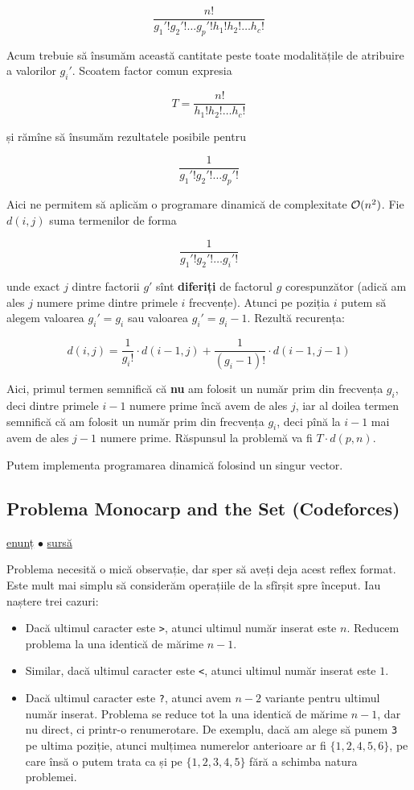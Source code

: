 \documentclass[../main.tex]{subfiles}
\begin{document}
$$\frac{n!}{g_1'! g_2'! \dots g_p'! h_1! h_2! \dots h_c!}$$

Acum trebuie să însumăm această cantitate peste toate modalitățile de atribuire a valorilor $g_i'$. Scoatem factor comun expresia

$$T = \frac{n!}{h_1! h_2! \dots h_c!}$$

și rămîne să însumăm rezultatele posibile pentru

$$\frac{1}{g_1'! g_2'! \dots g_p'!}$$

Aici ne permitem să aplicăm o programare dinamică de complexitate $\mathcal{O}(n^2)$. Fie $d(i, j)$ suma termenilor de forma

$$\frac{1}{g_1'! g_2'! \dots g_i'!}$$

unde exact $j$ dintre factorii $g'$ sînt \textbf{diferiți} de factorul $g$ corespunzător (adică am ales $j$ numere prime dintre primele $i$ frecvențe). Atunci pe poziția $i$ putem să alegem valoarea $g_i' = g_i$ sau valoarea $g_i' = g_i - 1$. Rezultă recurența:

$$d(i, j) = \frac{1}{g_i!} \cdot d(i - 1, j) + \frac{1}{(g_i - 1)!} \cdot d(i - 1, j - 1)$$

Aici, primul termen semnifică că \textbf{nu} am folosit un număr prim din frecvența $g_i$, deci dintre primele $i-1$ numere prime încă avem de ales $j$, iar al doilea termen semnifică că am folosit un număr prim din frecvența $g_i$, deci pînă la $i-1$ mai avem de ales $j-1$ numere prime. Răspunsul la problemă va fi $T \cdot d(p, n)$.

Putem implementa programarea dinamică folosind un singur vector.

\subsection{Problema Monocarp and the Set (Codeforces)}
\label{problem:monocarp-and-the-set}

\href{https://codeforces.com/contest/1886/problem/D}{enunț}
$\bullet$
\hyperref[code:monocarp-and-the-set]{sursă}

Problema necesită o mică observație, dar sper să aveți deja acest reflex format. Este mult mai simplu să considerăm operațiile de la sfîrșit spre început. Iau naștere trei cazuri:

\begin{itemize}
  \item Dacă ultimul caracter este \texttt{>}, atunci ultimul număr inserat este $n$. Reducem problema la una identică de mărime $n-1$.

  \item Similar, dacă ultimul caracter este \texttt{<}, atunci ultimul număr inserat este $1$.

  \item Dacă ultimul caracter este \texttt{?}, atunci avem $n-2$ variante pentru ultimul număr inserat. Problema se reduce tot la una identică de mărime $n-1$, dar nu direct, ci printr-o renumerotare. De exemplu, dacă am alege să punem \texttt{3} pe ultima poziție, atunci mulțimea numerelor anterioare ar fi $\{ 1, 2, 4, 5, 6 \}$, pe care însă o putem trata ca și pe $\{ 1, 2, 3, 4, 5 \}$ fără a schimba natura problemei.
\end{itemize}
\end{document}
